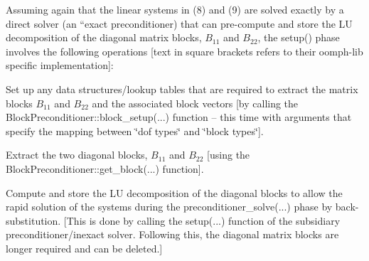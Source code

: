Assuming again that the linear systems in (8) and (9) are solved exactly by a direct solver (an ``exact preconditioner\textquotesingle{}\textquotesingle{}) that can pre-\/compute and store the LU decomposition of the diagonal matrix blocks, $ B_{11} $ and $ B_{22} $, the {\ttfamily setup()} phase involves the following operations \mbox{[}text in square brackets refers to their {\ttfamily oomph-\/lib} specific implementation\mbox{]}\+:
\begin{DoxyItemize}
\item Set up any data structures/lookup tables that are required to extract the matrix blocks $ B_{11} $ and $ B_{22} $ and the associated block vectors \mbox{[}by calling the {\ttfamily Block\+Preconditioner\+::block\+\_\+setup}(...) function -- this time with arguments that specify the mapping between \char`\"{}dof types\char`\"{} and \char`\"{}block types\char`\"{}\mbox{]}.
\item Extract the two diagonal blocks, $ B_{11} $ and $ B_{22}$ \mbox{[}using the {\ttfamily Block\+Preconditioner\+::get\+\_\+block}(...) function\mbox{]}.
\item Compute and store the LU decomposition of the diagonal blocks to allow the rapid solution of the systems during the {\ttfamily preconditioner\+\_\+solve}(...) phase by back-\/substitution. \mbox{[}This is done by calling the {\ttfamily setup}(...) function of the subsidiary preconditioner/inexact solver. Following this, the diagonal matrix blocks are longer required and can be deleted.\mbox{]}
\end{DoxyItemize}

